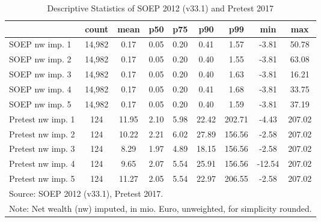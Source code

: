 \begin{table}[htbp]\centering
\def\sym#1{\ifmmode^{#1}\else\(^{#1}\)\fi}
\caption{Descriptive Statistics of SOEP 2012 (v33.1) and Pretest 2017}
\begin{tabular}{l*{1}{cccccccc}}
\hline\hline
                                            &       count&        mean&         p50&         p75&         p90&         p99&         min&         max\\
\hline
SOEP nw imp. 1                              &      14,982&        0.17&        0.05&        0.20&        0.41&        1.57&       -3.81&       50.78\\
SOEP nw imp. 2                              &      14,982&        0.17&        0.05&        0.20&        0.40&        1.55&       -3.81&       63.08\\
SOEP nw imp. 3                              &      14,982&        0.17&        0.05&        0.20&        0.40&        1.63&       -3.81&       16.21\\
SOEP nw imp. 4                              &      14,982&        0.17&        0.05&        0.20&        0.41&        1.68&       -3.81&       33.75\\
SOEP nw imp. 5                              &      14,982&        0.17&        0.05&        0.20&        0.40&        1.59&       -3.81&       37.19\\
Pretest nw imp. 1                           &         124&       11.95&        2.10&        5.98&       22.42&      202.71&       -4.43&      207.02\\
Pretest nw imp. 2                           &         124&       10.22&        2.21&        6.02&       27.89&      156.56&       -2.58&      207.02\\
Pretest nw imp. 3                           &         124&        8.29&        1.97&        4.89&       18.15&      156.56&       -2.58&      207.02\\
Pretest nw imp. 4                           &         124&        9.65&        2.07&        5.54&       25.91&      156.56&      -12.54&      207.02\\
Pretest nw imp. 5                           &         124&       11.27&        2.05&        5.54&       22.97&      206.55&       -2.58&      207.02\\
\hline\hline
\multicolumn{9}{l}{\footnotesize Source: SOEP 2012 (v33.1), Pretest 2017.}\\
\multicolumn{9}{l}{\footnotesize Note: Net wealth (nw) imputed, in mio. Euro, unweighted, for simplicity rounded.}\\
\end{tabular}
\end{table}

